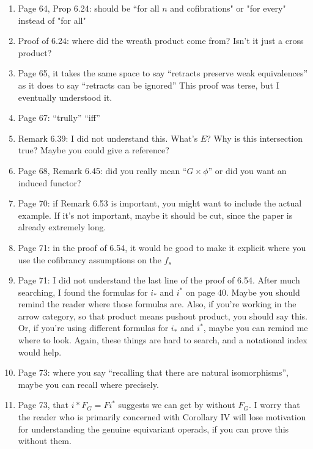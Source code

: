 \documentclass{article}
\begin{document}
\begin{enumerate}
	\item
	Page 64, Prop 6.24: should be ``for all $n$ and cofibrations" or "for every" instead of "for all"
	
	
	\item
	Proof of 6.24: where did the wreath product come from? Isn't it just a cross product?
	
	\item
	Page 65, it takes the same space to say ``retracts preserve weak equivalences'' as it does to say ``retracts can be ignored''
	This proof was terse, but I eventually understood it.
	
	\item
	Page 67: ``trully''
	``iff''
	
	\item
	Remark 6.39: I did not understand this. What's $E$? Why is this intersection true? Maybe you could give a reference?
	
	
	\item
	Page 68, Remark 6.45: did you really mean ``$G \times \phi$'' or did you want an induced functor?
	
	\item
	Page 70: if Remark 6.53 is important, you might want to include the actual example. If it's not important, maybe it should be cut, since the paper is already extremely long.
	
	\item
	Page 71: in the proof of 6.54, it would be good to make it explicit where you use the cofibrancy assumptions on the $f_s$
	
	\item
	Page 71: I did not understand the last line of the proof of 6.54. After much searching, I found the formulas for $i_*$ and $i^*$ on page 40. Maybe you should remind the reader where those formulas are. Also, if you're working in the arrow category, so that product means pushout product, you should say this. Or, if you're using different formulas for $i_*$ and $i^*$, maybe you can remind me where to look. Again, these things are hard to search, and a notational index would help.
	
	\item
	Page 73: where you say ``recalling that there are natural isomorphisms'', maybe you can recall where precisely.
	
	\item
	Page 73, that $i* F_G = F i^*$ suggests we can get by without $F_G$. I worry that the reader who is primarily concerned with Corollary IV will lose motivation for understanding the genuine equivariant operads, if you can prove this without them.
	

\end{enumerate}
\end{document}
